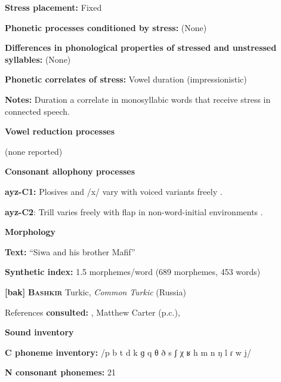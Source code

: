 \textbf{Stress placement:} Fixed



\textbf{Phonetic processes conditioned by stress:} (None)



\textbf{Differences in phonological properties of stressed and unstressed syllables:} (None)



\textbf{Phonetic correlates of stress:} Vowel duration (impressionistic)



\textbf{Notes:} Duration a correlate in monosyllabic words that receive stress in connected speech.



\textbf{Vowel reduction processes}



(none reported)



\textbf{Consonant allophony processes}



\textbf{ayz-C1:} Plosives and /x/ vary with voiced variants freely \citep[21-2]{Dol2007}.



\textbf{ayz-C2}: Trill varies freely with flap in non-word-initial environments \citep[24]{Dol2007}.



\textbf{Morphology}



\textbf{Text:} “Siwa and his brother Mafif” \citep[284-291]{Dol2007}



\textbf{Synthetic index:} 1.5 morphemes/word (689 morphemes, 453 words)



\textbf{[bak]}   \textbf{\textsc{Bashkir}}  Turkic, \textit{Common} \textit{Turkic} (Russia)



References \textbf{consulted:} \citet{BerksonEtAl2016}, Matthew Carter (p.c.), \citet{Poppe1964}



\textbf{Sound inventory}



\textbf{C phoneme inventory:} /p b t d k ɡ q θ ð s ʃ χ ʁ h m n ŋ l ɾ w j/



\textbf{N consonant phonemes:} 21



